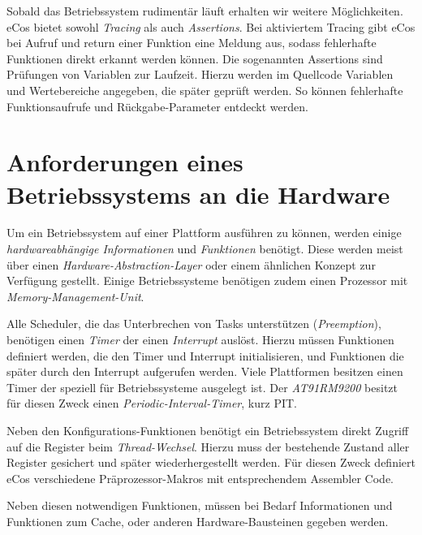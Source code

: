 \documentclass[
  a4paper,					%
  twoside,
  DIV=calc,     				%
  bibliography=totoc,
  cleardoublepage=empty,
  ngerman,     					%
  final       					%
]{scrbook}
\begin{document}
Sobald das Betriebssystem rudimentär läuft erhalten wir weitere Möglichkeiten. eCos bietet sowohl \emph{Tracing} als auch \emph{Assertions}. Bei aktiviertem Tracing gibt eCos bei Aufruf und return einer Funktion eine Meldung aus, sodass fehlerhafte Funktionen direkt erkannt werden können. Die sogenannten Assertions sind Prüfungen von Variablen zur Laufzeit. Hierzu werden im Quellcode Variablen und Wertebereiche angegeben, die später geprüft werden. So können fehlerhafte Funktionsaufrufe und Rückgabe-Parameter entdeckt werden.



\section{Anforderungen eines Betriebssystems an die Hardware}
\label{sec:anforderungen}
Um ein Betriebssystem auf einer Plattform ausführen zu können, werden einige \emph{hardwareabhängige Informationen} und \emph{Funktionen} benötigt. Diese werden meist über einen \emph{Hardware-Abstraction-Layer} oder einem ähnlichen Konzept zur Verfügung gestellt. Einige Betriebssysteme benötigen zudem einen Prozessor mit \emph{Memory-Management-Unit}.

Alle Scheduler, die das Unterbrechen von Tasks unterstützen (\emph{Preemption}), benötigen einen \emph{Timer} der einen \emph{Interrupt} auslöst. Hierzu müssen Funktionen definiert werden, die den Timer und Interrupt initialisieren, und Funktionen die später durch den Interrupt aufgerufen werden. Viele Plattformen besitzen einen Timer der speziell für Betriebssysteme ausgelegt ist. Der \emph{AT91RM9200} besitzt für diesen Zweck einen \emph{Periodic-Interval-Timer}, kurz PIT.

Neben den Konfigurations-Funktionen benötigt ein Betriebssystem direkt Zugriff auf die Register beim \emph{Thread-Wechsel}. Hierzu muss der bestehende Zustand aller Register gesichert und später wiederhergestellt werden. Für diesen Zweck definiert eCos verschiedene Präprozessor-Makros mit entsprechendem Assembler Code.

Neben diesen notwendigen Funktionen, müssen bei Bedarf Informationen und Funktionen zum Cache, oder anderen Hardware-Bausteinen gegeben werden.









\end{document}
